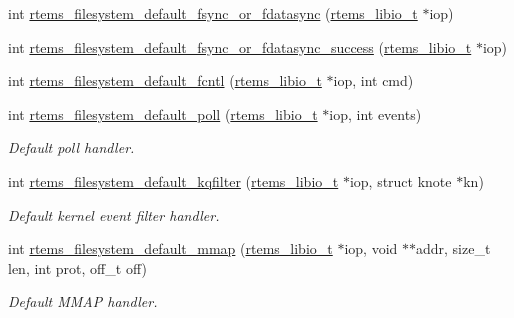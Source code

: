 \begin{DoxyCompactItemize}
\item 
int \mbox{\hyperlink{group__LibIOFSHandler_ga7bcb245cbe4a71b0952beca086b63e1b}{rtems\+\_\+filesystem\+\_\+default\+\_\+fsync\+\_\+or\+\_\+fdatasync}} (\mbox{\hyperlink{structrtems__libio__tt}{rtems\+\_\+libio\+\_\+t}} $\ast$iop)
\item 
int \mbox{\hyperlink{group__LibIOFSHandler_ga9447b9dc7947e64bde539307a8c0cdb5}{rtems\+\_\+filesystem\+\_\+default\+\_\+fsync\+\_\+or\+\_\+fdatasync\+\_\+success}} (\mbox{\hyperlink{structrtems__libio__tt}{rtems\+\_\+libio\+\_\+t}} $\ast$iop)
\item 
int \mbox{\hyperlink{group__LibIOFSHandler_ga090f67473d9fa5f26368adeb11c939c8}{rtems\+\_\+filesystem\+\_\+default\+\_\+fcntl}} (\mbox{\hyperlink{structrtems__libio__tt}{rtems\+\_\+libio\+\_\+t}} $\ast$iop, int cmd)
\item 
int \mbox{\hyperlink{group__LibIOFSHandler_ga608540b3299f81fabee388092bdfbc9f}{rtems\+\_\+filesystem\+\_\+default\+\_\+poll}} (\mbox{\hyperlink{structrtems__libio__tt}{rtems\+\_\+libio\+\_\+t}} $\ast$iop, int events)
\begin{DoxyCompactList}\small\item\em Default poll handler. \end{DoxyCompactList}\item 
int \mbox{\hyperlink{group__LibIOFSHandler_ga9616b979a36fc433734c0e79e2c13f3d}{rtems\+\_\+filesystem\+\_\+default\+\_\+kqfilter}} (\mbox{\hyperlink{structrtems__libio__tt}{rtems\+\_\+libio\+\_\+t}} $\ast$iop, struct knote $\ast$kn)
\begin{DoxyCompactList}\small\item\em Default kernel event filter handler. \end{DoxyCompactList}\item 
int \mbox{\hyperlink{group__LibIOFSHandler_gac2f7ea9b90b247cee91c3b6b10bf7ba9}{rtems\+\_\+filesystem\+\_\+default\+\_\+mmap}} (\mbox{\hyperlink{structrtems__libio__tt}{rtems\+\_\+libio\+\_\+t}} $\ast$iop, void $\ast$$\ast$addr, size\+\_\+t len, int prot, off\+\_\+t off)
\begin{DoxyCompactList}\small\item\em Default M\+M\+AP handler. \end{DoxyCompactList}\end{DoxyCompactItemize}
